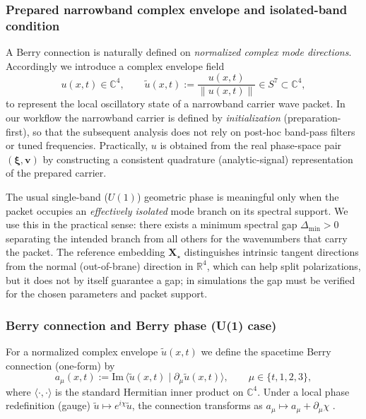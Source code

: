 \subsubsection{Prepared narrowband complex envelope and isolated-band condition}
A Berry connection is naturally defined on \emph{normalized complex mode directions}.
Accordingly we introduce a complex envelope field
\begin{equation}
  u(x,t)\in\mathbb C^4,
  \qquad
  \tilde u(x,t):=\frac{u(x,t)}{\|u(x,t)\|}\in S^7\subset\mathbb C^4,
  \label{eq:complex-envelope-normalized}
\end{equation}
to represent the local oscillatory state of a narrowband carrier wave packet.
In our workflow the narrowband carrier is defined by \emph{initialization} (preparation-first),
so that the subsequent analysis does not rely on post-hoc band-pass filters or tuned
frequencies. Practically, $u$ is obtained from the real phase-space pair $(\boldsymbol\xi,\mathbf v)$
by constructing a consistent quadrature (analytic-signal) representation of the prepared carrier.

The usual single-band ($U(1)$) geometric phase is meaningful only when the packet occupies an
\emph{effectively isolated} mode branch on its spectral support. We use this in the practical sense:
there exists a minimum spectral gap $\Delta_{\min}>0$ separating the intended branch from all others
for the wavenumbers that carry the packet.
The reference embedding $\mathbf X_\star$ distinguishes intrinsic tangent directions from the
normal (out-of-brane) direction in $\mathbb R^4$, which can help split polarizations, but it does
not by itself guarantee a gap; in simulations the gap must be verified for the chosen parameters
and packet support.

\subsubsection{Berry connection and Berry phase (U(1) case)}
For a normalized complex envelope $\tilde u(x,t)$ we define the spacetime Berry connection
(one-form) by
\begin{equation}
  a_\mu(x,t) := \mathrm{Im}\,\langle \tilde u(x,t)\mid \partial_\mu \tilde u(x,t)\rangle,
  \qquad \mu\in\{t,1,2,3\},
  \label{eq:spacetime-berry-connection}
\end{equation}
where $\langle\cdot,\cdot\rangle$ is the standard Hermitian inner product on $\mathbb C^4$.
Under a local phase redefinition (gauge) $\tilde u\mapsto e^{i\chi}\tilde u$, the connection transforms as
$a_\mu\mapsto a_\mu+\partial_\mu\chi$ \cite{Berry1984}.

